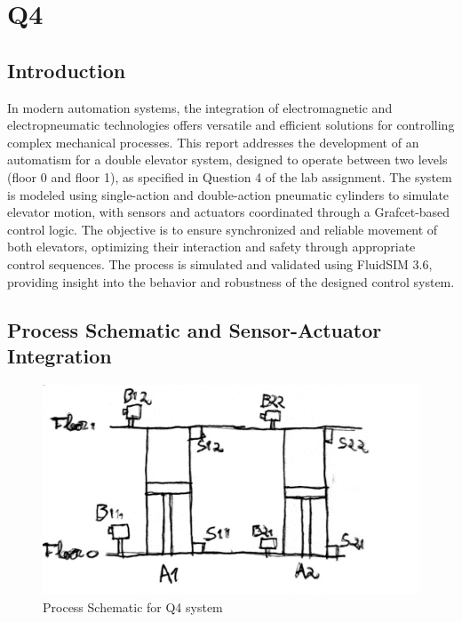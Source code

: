 \section{Q4} 

\subsection{Introduction} \label{sec:Introduction}

In modern automation systems, the integration of electromagnetic and electropneumatic technologies offers versatile 
and efficient solutions for controlling complex mechanical processes. This report addresses the development 
of an automatism for a double elevator system, designed to operate between two levels (floor 0 and floor 1),
as specified in Question 4 of the lab assignment. The system is modeled using single-action and double-action 
pneumatic cylinders to simulate elevator motion, with sensors and actuators coordinated through a Grafcet-based 
control logic. The objective is to ensure synchronized and reliable movement of both elevators, optimizing their 
interaction and safety through appropriate control sequences. The process is simulated and validated using FluidSIM 
3.6, providing insight into the behavior and robustness of the designed control system.

\subsection{Process Schematic and Sensor-Actuator Integration} \label{sec:Process_Schematic_and_Sensor-Actuator_Integration}

\begin{figure}[H]
    \includegraphics[width=16cm]{Images/Q4/Q4_schem.jpeg}
    \centering
    \caption{Process Schematic for Q4 system}
    \label{fig:Q4_schem}
\end{figure}


